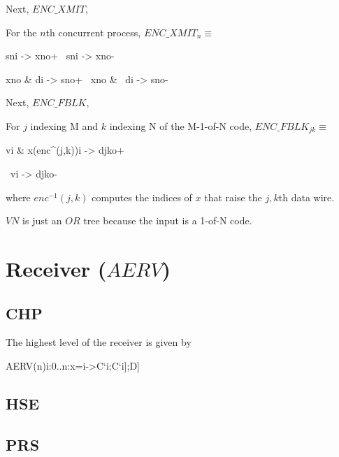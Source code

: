 \documentclass{article}
\begin{document}
Next, $ENC\_XMIT$,

For the $n$th concurrent process, $ENC\_XMIT_n\equiv$
\begin{prs2}
sni -> xno+
~sni -> xno-

xno & di -> sno+
~xno & ~di -> sno-
\end{prs2}

Next, $ENC\_FBLK$,

For $j$ indexing M and $k$ indexing N of the M-1-of-N code, $ENC\_FBLK_{jk}\equiv$
\begin{prs2}
vi & x(enc^{}(j,k))i -> djko+

~vi -> djko-
\end{prs2}

\noindent where $enc^{-1}(j,k)$ computes the indices of $x$ that raise the $j,k$th data wire.

$VN$ is just an $OR$ tree because the input is a 1-of-N code.

\section{Receiver ($AERV$)}

\subsection{CHP}

The highest level of the receiver is given by

\begin{csp}
AERV(n)\equiv*[dec(D)?x;[\langle[]i:0..n:x=i->C`i;C`i];D]
\end{csp}

\subsection{HSE}

\subsection{PRS}
\end{document}
